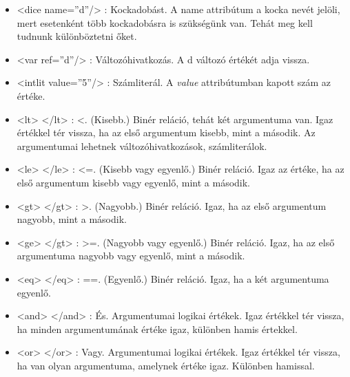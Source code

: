 \documentclass[12pt,a4paper,oneside]{report}
\newcommand{\attr}{\emph}
\begin{document}
\begin{itemize}
      \item <{\color{Tag}dice} {\color{Attr}name}={\color{Value}''d''}/>
        : Kockadobást. A name attribútum a kocka nevét jelöli, mert
        esetenként több kockadobásra is szükségünk van. Tehát meg kell
        tudnunk különböztetni őket.
    
      \item <{\color{Tag}var} {\color{Attr}ref}={\color{Value}''d''}/> :
        Változóhivatkozás. A d változó értékét adja vissza.
    
      \item <{\color{Tag}intlit}
        {\color{Attr}value}={\color{Value}''5''}/> : Számliterál. A
        \attr{value} attribútumban kapott szám az értéke.
    
      \item <{\color{Tag}lt}> <{\color{Tag}/lt}> : <. (Kisebb.) Binér
        reláció, tehát két argumentuma van. Igaz értékkel tér vissza,
        ha az első argumentum kisebb, mint a második. Az argumentumai
        lehetnek változóhivatkozások, számliterálok.
    
      \item <{\color{Tag}le}> <{\color{Tag}/le}> : <=. (Kisebb vagy
        egyenlő.) Binér reláció. Igaz az értéke, ha az első argumentum
        kisebb vagy egyenlő, mint a második.
    
      \item <{\color{Tag}gt}> <{\color{Tag}/gt}> : >. (Nagyobb.) Binér
        reláció. Igaz, ha az első argumentum nagyobb, mint a második.
    
      \item <{\color{Tag}ge}> <{\color{Tag}/gt}> : >=. (Nagyobb vagy
        egyenlő.) Binér reláció. Igaz, ha az első argumentuma nagyobb
        vagy egyenlő, mint a második.
    
      \item <{\color{Tag}eq}> <{\color{Tag}/eq}> : ==. (Egyenlő.)
        Binér reláció. Igaz, ha a két argumentuma egyenlő.
    
      \item <{\color{Tag}and}> <{\color{Tag}/and}> : És. Argumentumai
        logikai értékek. Igaz értékkel tér vissza, ha minden
        argumentumának értéke igaz, különben hamis értekkel.
    
      \item <{\color{Tag}or}> <{\color{Tag}/or}> : Vagy. Argumentumai
        logikai értékek. Igaz értékkel tér vissza, ha van olyan
        argumentuma, amelynek értéke igaz. Különben hamissal.
    

\end{itemize}
\end{document}
